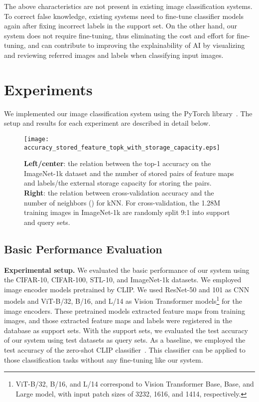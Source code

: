 \documentclass[runningheads]{llncs}
\begin{document}
The above characteristics are not present in existing image classification systems.
To correct false knowledge, existing systems need to fine-tune classifier models again after fixing incorrect labels in the support set.
On the other hand, our system does not require fine-tuning, thus eliminating the cost and effort for fine-tuning,
and can contribute to improving the explainability of AI by visualizing and reviewing referred images and labels when classifying input images.


\section{Experiments}
\label{sec:experiments}

We implemented our image classification system using the PyTorch library~\cite{pytorch}.
The setup and results for each experiment are described in detail below.


\begin{figure}[t]
   \texttt{[image: accuracy\_stored\_feature\_topk\_with\_storage\_capacity.eps]}
   \caption{\textbf{Left/center}: the relation between the top-1 accuracy on the ImageNet-1k dataset and the number of stored pairs of feature maps and labels/the external storage capacity for storing the pairs.
            \textbf{Right}: the relation between cross-validation accuracy and the number of neighbors () for kNN.
            For cross-validation, the 1.28M training images in ImageNet-1k are randomly split 9:1 into support and query sets.}
   \label{fig:accuracy_stored_feature_topk}
\end{figure}


\subsection{Basic Performance Evaluation}
\label{exprmnt:basic_evaluation}


\noindent
\textbf{Experimental setup.} We evaluated the basic performance of our system using the CIFAR-10, CIFAR-100, STL-10, and ImageNet-1k datasets.
We employed image encoder models pretrained by CLIP.
We used ResNet-50 and 101 as CNN models and ViT-B/32, B/16, and L/14 as Vision Transformer models\footnote{ViT-B/32, B/16, and L/14 correspond to
Vision Transformer Base, Base, and Large model, with input patch sizes of 3232, 1616, and 1414, respectively.} for the image encoders.
These pretrained models extracted feature maps from training images, and those extracted feature maps and labels were registered in the database as support sets.
With the support sets, we evaluated the test accuracy of our system using test datasets as query sets.
As a baseline, we employed the test accuracy of the zero-shot CLIP classifier~\cite{CLIP}. This classifier can be applied to those classification tasks without any fine-tuning like our system.
\end{document}
